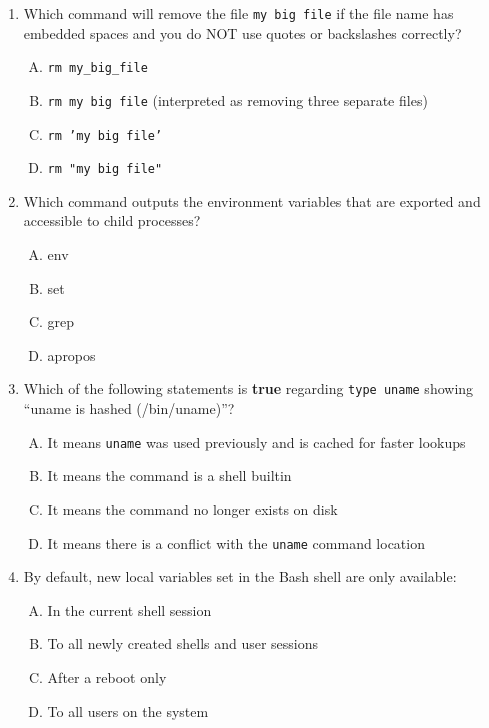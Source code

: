 \documentclass[a4paper]{report}
\begin{document}
\begin{enumerate}[1.]
    \item Which command will remove the file \texttt{my big file} if the file name has embedded spaces and you do NOT use quotes or backslashes correctly?  
    \begin{enumerate}[A)]
        \item \texttt{rm my\_big\_file}  
        \item \texttt{rm my big file} (interpreted as removing three separate files)  
        \item \texttt{rm 'my big file'}  
        \item \texttt{rm "my big file"}  
    \end{enumerate}

    \item Which command outputs the environment variables that are exported and accessible to child processes?  
    \begin{enumerate}[A)]
        \item env  
        \item set  
        \item grep  
        \item apropos  
    \end{enumerate}

    \item Which of the following statements is \textbf{true} regarding \texttt{type uname} showing “uname is hashed (/bin/uname)”?  
    \begin{enumerate}[A)]
        \item It means \texttt{uname} was used previously and is cached for faster lookups  
        \item It means the command is a shell builtin  
        \item It means the command no longer exists on disk  
        \item It means there is a conflict with the \texttt{uname} command location  
    \end{enumerate}

    \item By default, new local variables set in the Bash shell are only available:  
    \begin{enumerate}[A)]
        \item In the current shell session  
        \item To all newly created shells and user sessions  
        \item After a reboot only  
        \item To all users on the system  
    \end{enumerate}


\end{enumerate}
\end{document}
